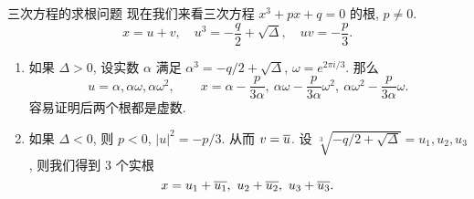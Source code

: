 \begin{frame}{三次方程的求根问题\noexer}
	\onslide<+->
	现在我们来看三次方程 $x^3+px+q=0$ 的根, $p\neq 0$.
	\onslide<+->
	\[x=u+v,\quad u^3=-\frac q2+\sqrt{\Delta},\quad uv=-\frac p3.\]
	\begin{enumerate}
		\item 如果 $\Delta>0$, 设实数 $\alpha$ 满足 $\alpha^3=-q/2+\sqrt{\Delta}$, $\omega=e^{2\pi i/3}$.
			\onslide<+->
			那么
			\[u=\alpha,\alpha\omega,\alpha\omega^2,\qquad
			x=\alpha-\frac p{3\alpha},\ \alpha\omega-\frac p{3\alpha} \omega^2,\ \alpha\omega^2-\frac p{3\alpha} \omega.\]
			\onslide<+->
			容易证明后两个根都是虚数.
		\item 如果 $\Delta<0$, 则 $p<0$, $|u|^2=-p/3$. 从而 $v=\overline u$.
			\onslide<+->设 $\sqrt[3]{-q/2+\sqrt{\Delta}}=u_1,u_2,u_3$,
			\onslide<+->
			则我们得到 $3$ 个实根
			\[x=u_1+\ov{u_1},\ u_2+\ov{u_2},\ u_3+\ov{u_3}.\]
	\end{enumerate}
\end{frame}

